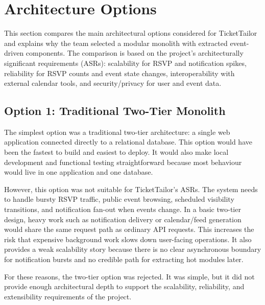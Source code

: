 \section{Architecture Options}
\label{sec:options}

This section compares the main architectural options considered for TicketTailor and explains why the team selected a modular monolith with extracted event-driven components. The comparison is based on the project's architecturally significant requirements (ASRs): scalability for RSVP and notification spikes, reliability for RSVP counts and event state changes, interoperability with external calendar tools, and security/privacy for user and event data.

\subsection{Option 1: Traditional Two-Tier Monolith}

The simplest option was a traditional two-tier architecture: a single web application connected directly to a relational database. This option would have been the fastest to build and easiest to deploy. It would also make local development and functional testing straightforward because most behaviour would live in one application and one database.

However, this option was not suitable for TicketTailor's ASRs. The system needs to handle bursty RSVP traffic, public event browsing, scheduled visibility transitions, and notification fan-out when events change. In a basic two-tier design, heavy work such as notification delivery or calendar/feed generation would share the same request path as ordinary API requests. This increases the risk that expensive background work slows down user-facing operations. It also provides a weak scalability story because there is no clear asynchronous boundary for notification bursts and no credible path for extracting hot modules later.

For these reasons, the two-tier option was rejected. It was simple, but it did not provide enough architectural depth to support the scalability, reliability, and extensibility requirements of the project.

